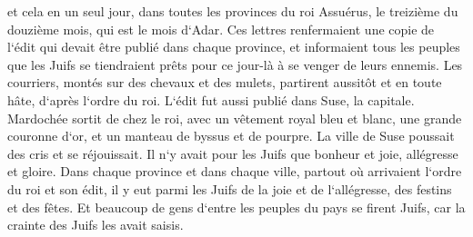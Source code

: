\verse et cela en un seul jour, dans toutes les provinces du roi Assuérus, le treizième du douzième mois, qui est le mois d`Adar. 
\verse Ces lettres renfermaient une copie de l`édit qui devait être publié dans chaque province, et informaient tous les peuples que les Juifs se tiendraient prêts pour ce jour-là à se venger de leurs ennemis. 
\verse Les courriers, montés sur des chevaux et des mulets, partirent aussitôt et en toute hâte, d`après l`ordre du roi. L`édit fut aussi publié dans Suse, la capitale. 
\verse Mardochée sortit de chez le roi, avec un vêtement royal bleu et blanc, une grande couronne d`or, et un manteau de byssus et de pourpre. La ville de Suse poussait des cris et se réjouissait. 
\verse Il n`y avait pour les Juifs que bonheur et joie, allégresse et gloire. 
\verse Dans chaque province et dans chaque ville, partout où arrivaient l`ordre du roi et son édit, il y eut parmi les Juifs de la joie et de l`allégresse, des festins et des fêtes. Et beaucoup de gens d`entre les peuples du pays se firent Juifs, car la crainte des Juifs les avait saisis. 

